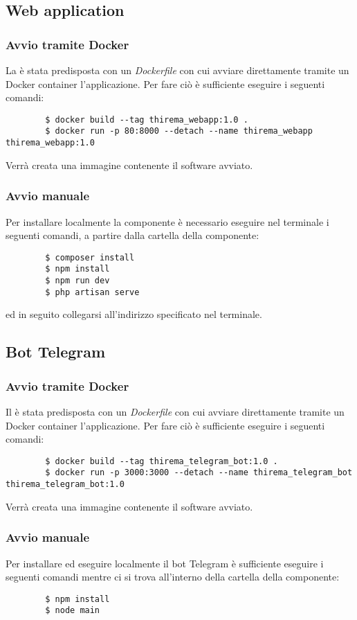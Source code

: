 	\subsection{Web application}

		\subsubsection{Avvio tramite Docker}
		La  è stata predisposta con un \textit{Dockerfile} con cui avviare direttamente tramite un Docker container l'applicazione. Per fare ciò è sufficiente eseguire i seguenti comandi:
		\begin{verbatim}
		$ docker build --tag thirema_webapp:1.0 .
		$ docker run -p 80:8000 --detach --name thirema_webapp thirema_webapp:1.0
		\end{verbatim}
		Verrà creata una immagine contenente il software avviato.

		\subsubsection{Avvio manuale}
		Per installare localmente la componente  è necessario eseguire nel terminale i seguenti comandi, a partire dalla cartella della componente:
		\begin{verbatim}
		$ composer install
		$ npm install
		$ npm run dev
		$ php artisan serve
		\end{verbatim}
		ed in seguito collegarsi all'indirizzo specificato nel terminale.

	\subsection{Bot Telegram}

		\subsubsection{Avvio tramite Docker}
		Il  è stata predisposta con un \textit{Dockerfile} con cui avviare direttamente tramite un Docker container l'applicazione. Per fare ciò è sufficiente eseguire i seguenti comandi:
		\begin{verbatim}
		$ docker build --tag thirema_telegram_bot:1.0 .
		$ docker run -p 3000:3000 --detach --name thirema_telegram_bot thirema_telegram_bot:1.0
		\end{verbatim}
		Verrà creata una immagine contenente il software avviato.

		\subsubsection{Avvio manuale}
		Per installare ed eseguire localmente il bot Telegram è sufficiente eseguire i seguenti comandi mentre ci si trova all'interno della cartella della componente:
		\begin{verbatim}
		$ npm install
		$ node main
		\end{verbatim}
		
